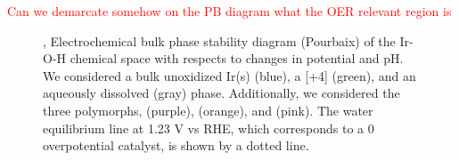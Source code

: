 \textcolor{red}{Can we demarcate somehow on the PB diagram what the OER relevant region is}
%
%
%


\begin{figure}
\centering
{}
\caption{\label{fig:bulk_pourbaix},
Electrochemical bulk phase stability diagram (Pourbaix) of the Ir-O-H chemical space with respects to changes in potential and pH.
%
We considered a bulk unoxidized Ir(s) (blue), a [+4] \rIrOtwo  (green), and an aqueously dissolved  (gray) phase.
%
Additionally, we considered the three  polymorphs, \aIrOthree (purple), \rIrOthree (orange), and \bIrOthree (pink).
%
The water equilibrium line at 1.23 V vs RHE, which corresponds to a 0 overpotential catalyst, is shown by a dotted line.
}
\end{figure}



